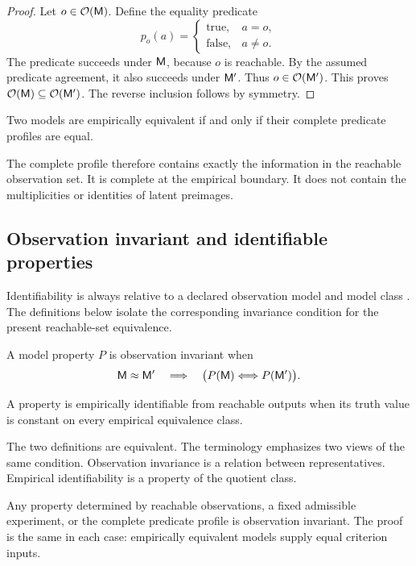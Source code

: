 \begin{proof}
Let \(o\in\mathcal O(\mathsf M)\). Define the equality predicate
\[
p_o(a)=
\begin{cases}
\mathrm{true}, & a=o,\\
\mathrm{false}, & a\neq o.
\end{cases}
\]
The predicate succeeds under \(\mathsf M\), because \(o\) is reachable. By the assumed predicate agreement, it also succeeds under \(\mathsf M'\). Thus \(o\in\mathcal O(\mathsf M')\). This proves \(\mathcal O(\mathsf M)\subseteq\mathcal O(\mathsf M')\). The reverse inclusion follows by symmetry.
\end{proof}
\begin{corollary}
Two models are empirically equivalent if and only if their complete predicate profiles are equal.
\end{corollary}
The complete profile therefore contains exactly the information in the reachable observation set. It is complete at the empirical boundary. It does not contain the multiplicities or identities of latent preimages.

\subsection{Observation invariant and identifiable properties}

Identifiability is always relative to a declared observation model and model class \parencite{Rothenberg1971,WalterPronzato1997,Raue2009,Villaverde2016}. The definitions below isolate the corresponding invariance condition for the present reachable-set equivalence.

\begin{definition}
A model property \(P\) is observation invariant when
\[
\mathsf M\approx\mathsf M'
\quad\Longrightarrow\quad
\bigl(P(\mathsf M)\Longleftrightarrow P(\mathsf M')\bigr).
\]
\end{definition}
\begin{definition}
A property is empirically identifiable from reachable outputs when its truth value is constant on every empirical equivalence class.
\end{definition}
The two definitions are equivalent. The terminology emphasizes two views of the same condition. Observation invariance is a relation between representatives. Empirical identifiability is a property of the quotient class.

Any property determined by reachable observations, a fixed admissible experiment, or the complete predicate profile is observation invariant. The proof is the same in each case: empirically equivalent models supply equal criterion inputs.

